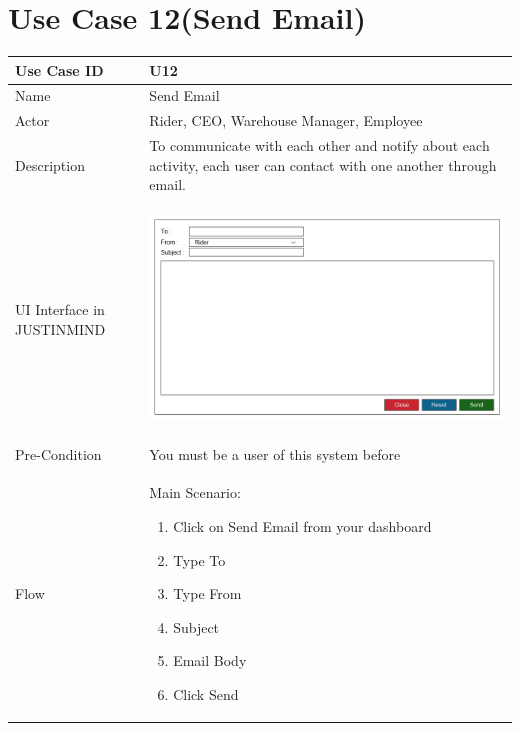\documentclass[12pt,a4paper]{report}
\begin{document}

\section{Use Case 12(Send Email) }

\begin{tabular}{ | m{3cm} | m{12cm}| } \hline

Use Case ID &  U12 \\\hline

Name  	    &  Send Email \\ \hline

Actor     	&  Rider, CEO, Warehouse Manager, Employee \\ \hline

Description & To communicate with each other and notify about each activity, each user can contact with one another through email. \\ \hline

UI Interface in JUSTINMIND & \begin{center} \includegraphics[scale=0.3]{./UIs for Latex Reports/UI-013 SendEmail@1x.png}\end{center}  \\ \hline

Pre-Condition & You must be a user of this system before  \\ \hline


Flow & Main Scenario:

\begin{enumerate}
\item   Click on Send Email from your dashboard
\item   Type To
\item   Type From
\item   Subject
\item   Email Body
\item   Click Send



\end{enumerate}
\end{tabular}
\end{document}
